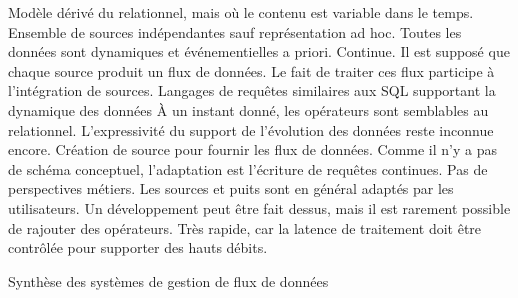 \begin{table}[!ht]
\criteretabDonnee
    {Modèle dérivé du relationnel, mais où le contenu est variable dans le temps.}
    {Ensemble de sources indépendantes sauf représentation ad hoc.}
    {Toutes les données sont dynamiques et événementielles a priori.}
\criteretabTraitement
    {Continue.}
    {Il est supposé que chaque source produit un flux de données. Le fait de traiter ces flux participe à l'intégration de sources.}
    {Langages de requêtes similaires aux SQL supportant la dynamique des données}
    {À un instant donné, les opérateurs sont semblables au relationnel. L'expressivité du support de l'évolution des données reste inconnue encore.}
\criteretabAdaptabilite
    {Création de source pour fournir les flux de données. Comme il n'y a pas de schéma conceptuel, l'adaptation est l'écriture de requêtes continues.}
    {Pas de perspectives métiers.}
    {Les sources et puits sont en général adaptés par les utilisateurs. Un développement peut être fait dessus, mais il est rarement possible de rajouter des opérateurs.}
    {Très rapide, car la latence de traitement doit être contrôlée pour supporter des hauts débits.}
\caption{Synthèse des systèmes de gestion de flux de données}\label{tab:rw:supervision:sgfd:synthese}
\end{table}
